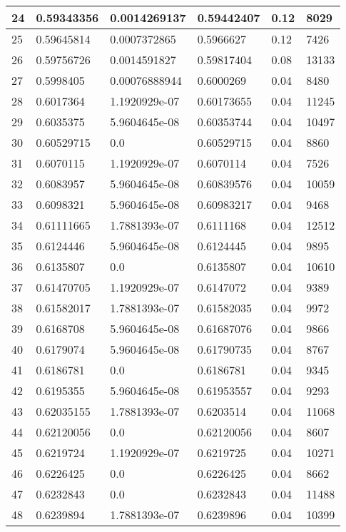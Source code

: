 \begin{longtable}{|l|l|l|l|l|l|}
24 & 0.59343356 & 0.0014269137 & 0.59442407 & 0.12 & 8029 \\ \hline 
25 & 0.59645814 & 0.0007372865 & 0.5966627 & 0.12 & 7426 \\ \hline 
26 & 0.59756726 & 0.0014591827 & 0.59817404 & 0.08 & 13133 \\ \hline 
27 & 0.5998405 & 0.00076888944 & 0.6000269 & 0.04 & 8480 \\ \hline 
28 & 0.6017364 & 1.1920929e-07 & 0.60173655 & 0.04 & 11245 \\ \hline 
29 & 0.6035375 & 5.9604645e-08 & 0.60353744 & 0.04 & 10497 \\ \hline 
30 & 0.60529715 & 0.0 & 0.60529715 & 0.04 & 8860 \\ \hline 
31 & 0.6070115 & 1.1920929e-07 & 0.6070114 & 0.04 & 7526 \\ \hline 
32 & 0.6083957 & 5.9604645e-08 & 0.60839576 & 0.04 & 10059 \\ \hline 
33 & 0.6098321 & 5.9604645e-08 & 0.60983217 & 0.04 & 9468 \\ \hline 
34 & 0.61111665 & 1.7881393e-07 & 0.6111168 & 0.04 & 12512 \\ \hline 
35 & 0.6124446 & 5.9604645e-08 & 0.6124445 & 0.04 & 9895 \\ \hline 
36 & 0.6135807 & 0.0 & 0.6135807 & 0.04 & 10610 \\ \hline 
37 & 0.61470705 & 1.1920929e-07 & 0.6147072 & 0.04 & 9389 \\ \hline 
38 & 0.61582017 & 1.7881393e-07 & 0.61582035 & 0.04 & 9972 \\ \hline 
39 & 0.6168708 & 5.9604645e-08 & 0.61687076 & 0.04 & 9866 \\ \hline 
40 & 0.6179074 & 5.9604645e-08 & 0.61790735 & 0.04 & 8767 \\ \hline 
41 & 0.6186781 & 0.0 & 0.6186781 & 0.04 & 9345 \\ \hline 
42 & 0.6195355 & 5.9604645e-08 & 0.61953557 & 0.04 & 9293 \\ \hline 
43 & 0.62035155 & 1.7881393e-07 & 0.6203514 & 0.04 & 11068 \\ \hline 
44 & 0.62120056 & 0.0 & 0.62120056 & 0.04 & 8607 \\ \hline 
45 & 0.6219724 & 1.1920929e-07 & 0.6219725 & 0.04 & 10271 \\ \hline 
46 & 0.6226425 & 0.0 & 0.6226425 & 0.04 & 8662 \\ \hline 
47 & 0.6232843 & 0.0 & 0.6232843 & 0.04 & 11488 \\ \hline 
48 & 0.6239894 & 1.7881393e-07 & 0.6239896 & 0.04 & 10399 \\ \hline 

\end{longtable}
